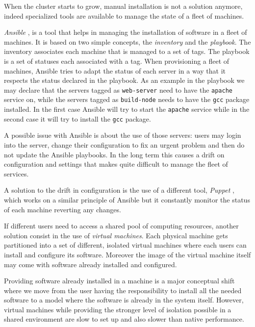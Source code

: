 When the cluster starts to grow, manual installation is not a solution anymore,
indeed specialized tools are available to manage the state of a fleet of
machines.

\textit{Ansible} \cite{ansible}, \cite{provisioning} is a tool that helps in
managing the installation of software in a fleet of machines. It is based on two
simple concepts, the \textit{inventory} and the \textit{playbook}. The
inventory associates each machine that is managed to a set of tags. The playbook
is a set of statuses each associated with a tag. When provisioning a fleet of
machines, Ansible tries to adapt the status of each server in a way that it
respects the status declared in the playbook. As an example in the playbook we
may declare that the servers tagged as \texttt{web-server} need to have the
\texttt{apache} service on, while the servers tagged as \texttt{build-node}
needs to have the \texttt{gcc} package installed. In the first case Ansible
will try to start the \texttt{apache} service while in the second case it will
try to install the \texttt{gcc} package.

A possible issue with Ansible is about the use of those servers: users may
login into the server, change their configuration to fix an urgent problem and
then do not update the Ansible playbooks. In the long term this causes a drift
on configuration and settings that makes quite difficult to manage the fleet of
services.

A solution to the drift in configuration is the use of a different tool,
\textit{Puppet} \cite{puppet}, \cite{provisioning} which works on a similar
principle of Ansible but it constantly monitor the status of each machine
reverting any changes.

If different users need to access a shared pool of computing resources, another
solution consist in the use of \textit{virtual machines}. Each physical machine
gets partitioned into a set of different, isolated virtual machines where each
users can install and configure its software. Moreover the image of the virtual
machine itself may come with software already installed and configured.

Providing software already installed in a machine is a major conceptual shift
where we move from the user having the responsibility to install all the needed
software to a model where the software is already in the system itself.
However, virtual machines while providing the stronger level of isolation
possible in a shared environment are slow to set up and also slower than native
performance.

